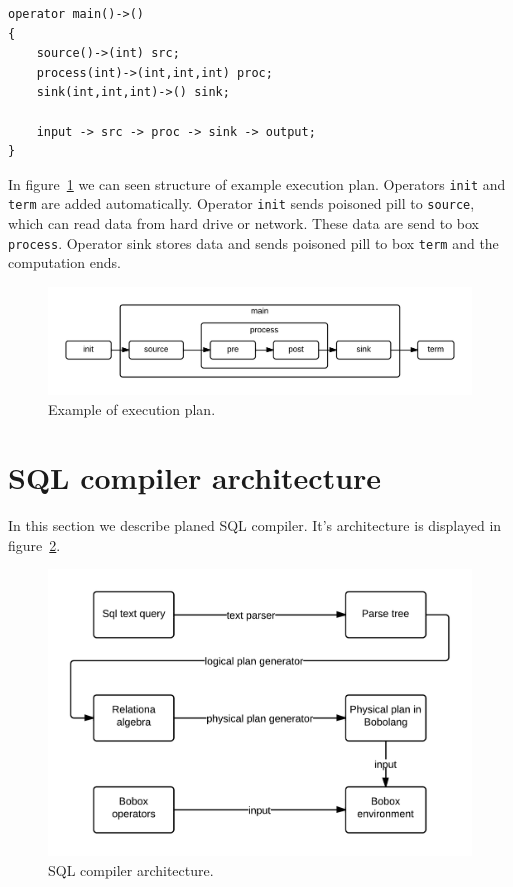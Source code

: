 \begin{verbatim}
operator main()->()
{
    source()->(int) src;
    process(int)->(int,int,int) proc;
    sink(int,int,int)->() sink;

    input -> src -> proc -> sink -> output;
}
\end{verbatim}
 In figure~\ref{fig:exampleplan} we can seen structure of example execution plan. Operators \verb|init| and \verb|term| are added automatically. Operator \verb|init| sends poisoned pill to \verb|source|, which can read data from hard drive or network. These data are send to box \verb|process|. Operator sink stores data and sends poisoned pill to box \verb|term| and the computation ends.
\begin{figure}[h!]
  \centering

    \includegraphics[width=1\textwidth]{exampleplan}
    
      \caption{Example of execution plan.}
        \label{fig:exampleplan}
\end{figure}


\section{SQL compiler architecture}
In this section we describe planed SQL compiler. It's architecture is displayed in figure~\ref{fig:sqlarchitecture}. 
\begin{figure}[h!]
  \centering

    \includegraphics[width=1\textwidth]{sqlarchitecture}
    
      \caption{SQL compiler architecture.}
        \label{fig:sqlarchitecture}
\end{figure}

